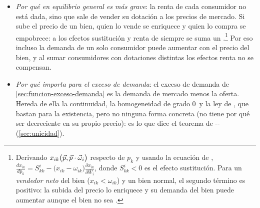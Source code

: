 \documentclass[11pt]{article}
\begin{document}
\begin{itemize}
\begin{enumerate}
  \item la demanda de mercado depende de \emph{cómo se reparte} la renta, no solo de su total: si los precios pasan renta de $A$ a $B$ y estos gastan de forma distinta, la demanda cambia aunque la renta total no cambie. Solo depende de la renta total si todos los consumidores gastan igual cada euro adicional (curvas de  rectas y paralelas entre consumidores: la forma polar de )\nocite{MasColellWhinstonGreen1995};
  \item la \emph{ley de la demanda} y la simetría y la semidefinición negativa de la matriz de , que valen para cada consumidor , no tienen por qué valer en el agregado;
  \item el \emph{axioma débil de la preferencia revelada}: cada consumidor lo cumple , pero la demanda de mercado no tiene por qué cumplirlo\nocite{MasColellWhinstonGreen1995}.
  \end{enumerate}
\item \emph{Por qué en equilibrio general es más grave}: la renta de cada consumidor no está dada, sino que sale de vender su dotación a los precios de mercado. Si sube el precio de un bien, quien lo vende se enriquece y quien lo compra se empobrece: a los efectos sustitución y renta de siempre se suma un .\footnote{Derivando $x_{ik}\big(\vec{p},\vec{p}\cdot\vec{\omega}_i\big)$ respecto de $p_k$ y usando la ecuación de , $\frac{d x_{ik}}{d p_k}=S^i_{kk}-\big(x_{ik}-\omega_{ik}\big)\frac{\partial x_{ik}}{\partial \overline{W}_i}$, donde $S^i_{kk}<0$ es el efecto sustitución. Para un \emph{vendedor neto} del bien ($x_{ik}<\omega_{ik}$) y un bien normal, el segundo término es positivo: la subida del precio lo enriquece y su demanda del bien puede aumentar aunque el bien no sea .} Por eso incluso la demanda de un solo consumidor puede aumentar con el precio del bien, y al sumar consumidores con dotaciones distintas los efectos renta no se compensan.
\item \emph{Por qué importa para el exceso de demanda}: el exceso de demanda de \ref{sec:funcion-exceso-demanda} es la demanda de mercado menos la oferta. Hereda de ella la continuidad, la homogeneidad de grado 0~y la ley de , que bastan para la existencia, pero no ninguna forma concreta (no tiene por qué ser decreciente en su propio precio): es lo que dice el teorema de -- (\ref{sec:unicidad}).
\end{itemize}
\end{document}
